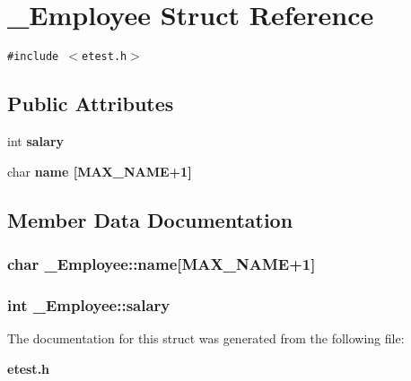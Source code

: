 \section{\_\-Employee Struct Reference}
\label{struct__Employee}
{\tt \#include $<$etest.h$>$}

\subsection*{Public Attributes}
\begin{CompactItemize}
\item 
int \bf{salary}
\item 
char \bf{name} [MAX\_\-NAME+1]
\end{CompactItemize}


\subsection{Member Data Documentation}
\subsubsection{\setlength{\rightskip}{0pt plus 5cm}char \bf{\_\-Employee::name}[MAX\_\-NAME+1]}\label{struct__Employee_99e96c306c0245947184255cd20aac27}


\subsubsection{\setlength{\rightskip}{0pt plus 5cm}int \bf{\_\-Employee::salary}}\label{struct__Employee_c326f9bd5d7647060effee3af87a8ed5}




The documentation for this struct was generated from the following file:\begin{CompactItemize}
\item 
\bf{etest.h}\end{CompactItemize}
